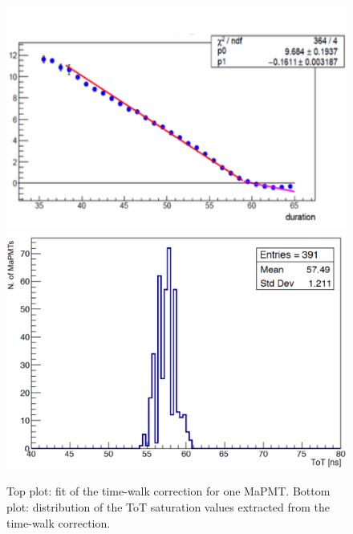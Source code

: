 \documentclass[5p,times,twocolumn]{elsarticle}
\begin{document}
\begin{figure}[t]
\begin{center}
\includegraphics[width=1.0\columnwidth]{time_walk_fit.png}
\includegraphics[width=0.9\columnwidth]{Saturation_ToT2.png}
\end{center}
\caption{Top plot: fit of the time-walk correction for one MaPMT. Bottom plot: distribution of the ToT saturation
  values extracted from the time-walk correction.}
\label{Fig:TimeWalk}
\end{figure}
\end{document}
